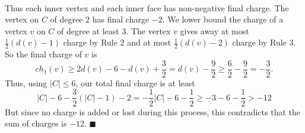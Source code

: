\documentclass[letterpaper,12pt,oneside,onecolumn]{article}
\begin{document}
\paragraph{}
Thus each inner vertex and each inner face has non-negative final charge. The vertex on $C$ of degree $2$ has final charge $-2$. We lower bound the charge of a vertex $v$ on $C$ of degree at least $3$. The vertex $v$ gives away at most $\frac{1}{2}(d(v) - 1)$ charge by Rule $2$ and at most $\frac{1}{2}(d(v) - 2)$ charge by Rule $3$. So the final charge of $v$ is
$$ch_1(v) \geq 2d(v) - 6 - d(v) + \frac{3}{2} = d(v) - \frac{9}{2} \geq \frac{6}{2} - \frac{9}{2} = -\frac{3}{2}.$$
Thus, using $|C| \leq 6$, our total final charge is at least
$$|C| - 6 -\frac{3}{2}(|C| -1) - 2 = -\frac{1}{2}|C| - 6 -\frac{1}{2} \geq -3 -6 -\frac{1}{2} > -12$$
But since no charge is added or lost during this process, this contradicts that the sum of charges is $-12$. $\blacksquare$

\newpage
\section{}
\end{document}
